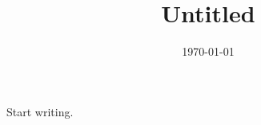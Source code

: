 \documentclass{article}
\title{Untitled}
\author{}
\date{\today}
\begin{document}
\maketitle

Start writing.
\end{document}
